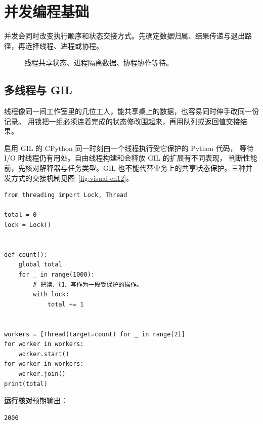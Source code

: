 \documentclass[UTF8,a4paper,oneside,openany,fontset=none,11pt]{ctexbook}
\newcommand{\code}[1]{\texttt{\detokenize{#1}}}
\begin{document}
\chapter{并发编程基础}
\label{ch:12-outline}

并发会同时改变执行顺序和状态交接方式。先确定数据归属、结果传递与退出路径，再选择线程、进程或协程。


\begin{figure}[htbp]
  \centering
  \caption*{线程共享状态、进程隔离数据、协程协作等待。}
\end{figure}


\section{多线程与 GIL}

线程像同一间工作室里的几位工人，能共享桌上的数据，也容易同时伸手改同一份记录。
用锁把一组必须连着完成的状态修改围起来，再用队列或返回值交接结果。

启用 GIL 的 CPython 同一时刻由一个线程执行受它保护的 Python 代码，
等待 I/O 时线程仍有用处。自由线程构建和会释放 GIL 的扩展有不同表现，
判断性能前，先核对解释器与任务类型。GIL 也不能代替业务上的共享状态保护。三种并发方式的交接机制见图~\ref{fig:visual-ch12}。


\begin{lstlisting}[title={\code{locked_count.py}}]
from threading import Lock, Thread

total = 0
lock = Lock()


def count():
    global total
    for _ in range(1000):
        # 把读、加、写作为一段受保护的操作。
        with lock:
            total += 1


workers = [Thread(target=count) for _ in range(2)]
for worker in workers:
    worker.start()
for worker in workers:
    worker.join()
print(total)
\end{lstlisting}


\textbf{运行核对}\enspace 预期输出：
\begin{lstlisting}[language={},numbers=none]
2000
\end{lstlisting}
\end{document}
